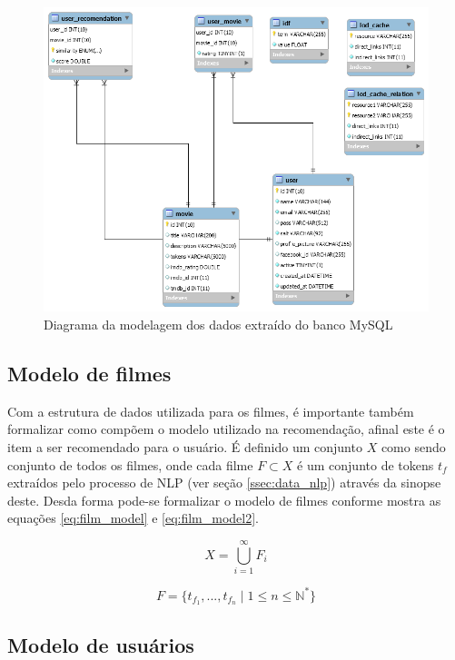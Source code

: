 \begin{figure}
	\centering
	\includegraphics[scale=0.5]{imagens/user_model.png}
	\caption{Diagrama da modelagem dos dados extraído do banco MySQL}
	\label{fig:user_model}
\end{figure}

\subsection{Modelo de filmes}

Com a estrutura de dados utilizada para os filmes, é importante também formalizar como compõem o modelo utilizado na recomendação, afinal este é o item a ser recomendado para o usuário. É definido um conjunto $X$ como sendo conjunto de todos os filmes, onde cada filme $F \subset X$ é um conjunto de tokens $t_f$ extraídos pelo processo de \ac{NLP} (ver seção \ref{ssec:data_nlp}) através da sinopse deste. Desda forma pode-se formalizar o modelo de filmes conforme mostra as equações \ref{eq:film_model} e \ref{eq:film_model2}.

\begin{equation}
	X = \bigcup\limits_{i=1}^{\infty} F_{i}
\label{eq:film_model}
\end{equation}

\begin{equation}
	F = \{t_{f_1}, ..., t_{f_n} \; | \; 1 \leq n \leq \mathbb{N}^*\}
\label{eq:film_model2}
\end{equation}

\subsection{Modelo de usuários}
\label{ssec:user_model}


